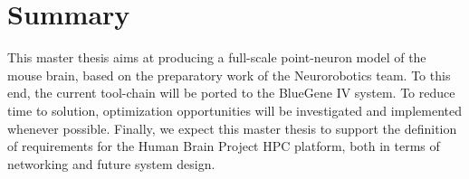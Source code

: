 \documentclass[a4paper]{article}
\begin{document}
  



\section{Summary}
This master thesis aims at producing a full-scale point-neuron model of the mouse
brain, based on the preparatory work of the Neurorobotics team. To this end, the
current tool-chain will be ported to the BlueGene IV system. To reduce time to
solution, optimization opportunities will be investigated and implemented whenever
possible.
Finally, we expect this master thesis to support the definition of requirements for the
Human Brain Project HPC platform, both in terms of networking and future system design.

\newpage



\end{document}
